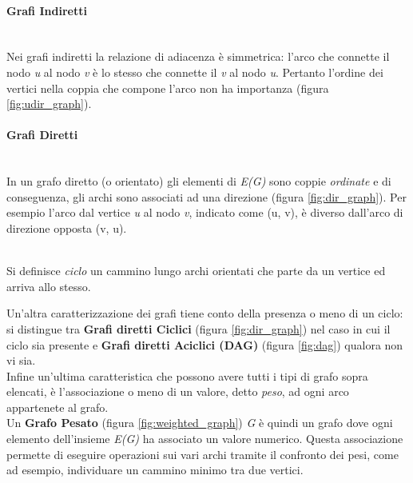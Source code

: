 \paragraph{Grafi Indiretti}~\\
Nei grafi indiretti la relazione di adiacenza è simmetrica: l'arco che connette il nodo \textit{u} al nodo \textit{v} è lo stesso che connette il \textit{v} al nodo \textit{u}. Pertanto l'ordine dei vertici nella coppia che compone l'arco non ha importanza (figura \ref{fig:udir_graph}).

\paragraph{Grafi Diretti}~\\
In un grafo diretto (o orientato) gli elementi di \textit{E(G)} sono coppie \emph{ordinate} e di conseguenza, gli archi sono associati ad una direzione (figura \ref{fig:dir_graph}). Per esempio l'arco dal vertice \textit{u} al nodo \textit{v}, indicato come (u, v), è diverso dall'arco di direzione opposta (v, u).\\~\\

\begin{defn}
	Si definisce \emph{ciclo} un cammino lungo archi orientati che parte da un vertice ed arriva allo stesso.
\end{defn}

Un'altra caratterizzazione dei grafi tiene conto della presenza o meno di un ciclo: si distingue tra \textbf{Grafi diretti Ciclici} (figura \ref{fig:dir_graph}) nel caso in cui il ciclo sia presente e \textbf{Grafi diretti Aciclici (DAG)} (figura \ref{fig:dag}) qualora non vi sia.\\

Infine un'ultima caratteristica che possono avere tutti i tipi di grafo sopra elencati, è l'associazione o meno di un valore, detto \emph{peso}, ad ogni arco appartenete al grafo.\\
Un \textbf{Grafo Pesato} (figura \ref{fig:weighted_graph}) \textit{G} è quindi un grafo dove ogni elemento dell'insieme \textit{E(G)} ha associato un valore numerico. Questa associazione permette di eseguire operazioni sui vari archi tramite il confronto dei pesi, come ad esempio, individuare un cammino minimo tra due vertici.

